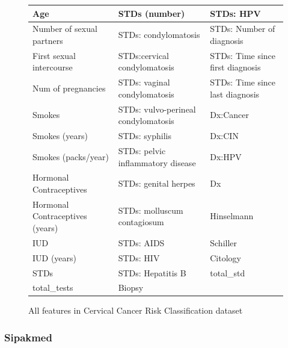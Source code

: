 \documentclass[12pt]{report}
\begin{document}
\begin{figure}
    \centering
    
    \begin{tabular}{|m{5em}|m{5em}|m{5em}|}
        
        \hline
         Age&STDs (number)&STDs: HPV  \\
         \hline
         Number of sexual partners& STDs: condylomatosis &STDs: Number of diagnosis\\
         \hline
         First sexual intercourse& STDs:cervical condylomatosis &STDs: Time since first diagnosis\\
         \hline
         Num of pregnancies& STDs: vaginal condylomatosis &STDs: Time since last diagnosis\\
         \hline
         Smokes& STDs: vulvo-perineal condylomatosis & Dx:Cancer\\
         \hline
         Smokes (years)&STDs: syphilis&Dx:CIN	  \\
         \hline
         Smokes (packs/year)&  STDs: pelvic inflammatory disease&Dx:HPV\\
         \hline
         Hormonal Contraceptives& STDs: genital herpes &Dx \\
         \hline
         Hormonal Contraceptives (years)&  STDs: molluscum contagiosum & Hinselmann\\
         \hline
         IUD&  STDs: AIDS & Schiller\\
         \hline
         IUD (years)& STDs: HIV& Citology \\
         \hline
         STDs&  STDs: Hepatitis B & total\_std\\
         \hline
         total\_tests&Biopsy& \\
         \hline
    \end{tabular}
    \caption{All features in Cervical Cancer Risk Classification dataset}
    \label{Feature_list}
\end{figure}		







\subsubsection{Sipakmed}
\end{document}
